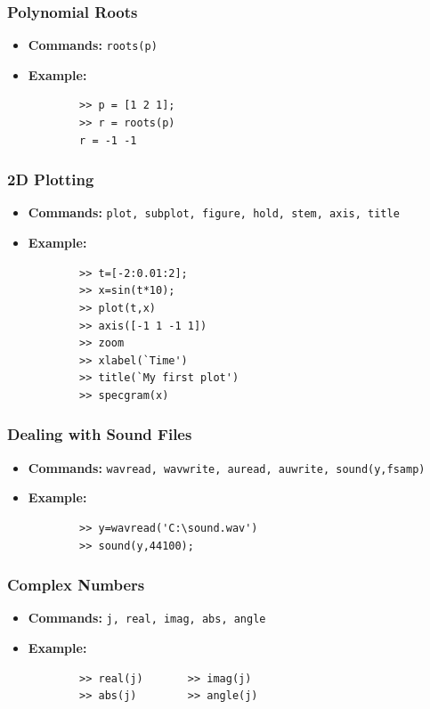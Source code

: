 \documentclass{lab_sheet}
\begin{document}
\subsubsection{Polynomial Roots}
\begin{itemize}
    \item \textbf{Commands:} \texttt{roots(p)}
    \item \textbf{Example:}
    \begin{verbatim}
        >> p = [1 2 1];
        >> r = roots(p)
        r = -1 -1
\end{verbatim}
\end{itemize}
\subsubsection{2D Plotting}
\begin{itemize}
    \item \textbf{Commands:} \texttt{plot, subplot, figure, hold, stem, axis, title}
    \item \textbf{Example:}
    \begin{verbatim}
        >> t=[-2:0.01:2];
        >> x=sin(t*10);
        >> plot(t,x)
        >> axis([-1 1 -1 1])
        >> zoom
        >> xlabel(`Time')
        >> title(`My first plot')
        >> specgram(x)
\end{verbatim}
\end{itemize}
\subsubsection{Dealing with Sound Files}
\begin{itemize}
    \item \textbf{Commands:} \texttt{wavread, wavwrite, auread, auwrite, sound(y,fsamp)}
    \item \textbf{Example:}
    \begin{verbatim}
        >> y=wavread('C:\sound.wav')
        >> sound(y,44100);
\end{verbatim}
\end{itemize}
\subsubsection{Complex Numbers}
\begin{itemize}
    \item \textbf{Commands:} \texttt{j, real, imag, abs, angle}
    \item \textbf{Example:}
    \begin{verbatim}
        >> real(j)       >> imag(j)
        >> abs(j)        >> angle(j)
\end{verbatim}
\end{itemize}
\end{document}
